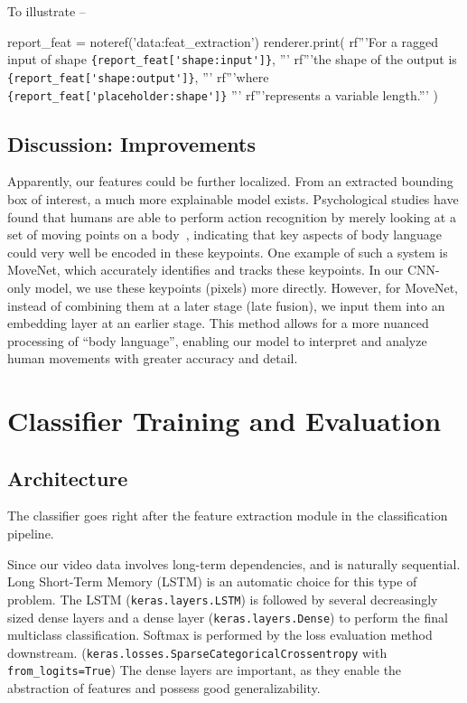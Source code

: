 \documentclass[letterpaper]{article} %
\begin{document}
To illustrate --
\begin{python}
  report_feat = noteref('data:feat_extraction')
  renderer.print(
    rf'''For a ragged input of shape \lstinline|{report_feat['shape:input']}|, '''
    rf'''the shape of the output is \lstinline|{report_feat['shape:output']}|, '''
    rf'''where \lstinline|{report_feat['placeholder:shape']}| '''
    rf'''represents a variable length.'''
  )
\end{python}

\subsection{Discussion: Improvements}
Apparently, our features could be further localized. 
From an extracted bounding box of interest, a much more explainable model exists. 
Psychological studies have found that humans are able to perform action recognition 
by merely looking at a set of moving points on a body~\citep{Johansson1973}, 
indicating that key aspects of body language could 
very well be encoded in these keypoints.
One example of such a system is MoveNet, 
which accurately identifies and tracks these keypoints. 
In our CNN-only model, we use these keypoints (pixels) more directly. 
However, for MoveNet, instead of combining them at a later stage (late fusion), 
we input them into an embedding layer at an earlier stage. 
This method allows for a more nuanced processing of ``body language'', 
enabling our model to interpret and analyze human movements 
with greater accuracy and detail.

\section{Classifier Training and Evaluation}

\subsection{Architecture}
The classifier goes right after the feature extraction
module in the classification pipeline.

Since our video data involves long-term dependencies,
and is naturally sequential.
Long Short-Term Memory (LSTM) is an automatic choice
for this type of problem.
The LSTM (\lstinline|keras.layers.LSTM|) is followed by 
several decreasingly sized dense layers
and a dense layer (\lstinline|keras.layers.Dense|)
to perform the final multiclass classification.
Softmax is performed by the loss evaluation method downstream.
(\lstinline|keras.losses.SparseCategoricalCrossentropy| 
with \lstinline|from_logits=True|)
The dense layers are important,
as they enable the abstraction of features
and possess good generalizability.
\end{document}
